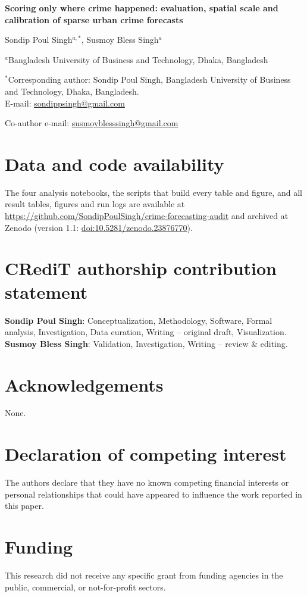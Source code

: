 \documentclass[11pt]{article}
\begin{document}
\begin{center}
{\Large\bfseries Scoring only where crime happened: evaluation, spatial scale and calibration of sparse urban crime forecasts\par}
\vspace{1.2em}
{\large Sondip Poul Singh$^{a,*}$, Susmoy Bless Singh$^{a}$\par}
\vspace{0.6em}
$^{a}$Bangladesh University of Business and Technology, Dhaka, Bangladesh\par
\end{center}

\vspace{1em}
\noindent $^{*}$Corresponding author: Sondip Poul Singh, Bangladesh University of Business and Technology, Dhaka, Bangladesh.\\
E-mail: \href{mailto:sondippsingh@gmail.com}{sondippsingh@gmail.com}

\noindent Co-author e-mail: \href{mailto:susmoyblesssingh@gmail.com}{susmoyblesssingh@gmail.com}

\section*{Data and code availability}
The four analysis notebooks, the scripts that build every table and figure, and all result tables, figures and run logs are available at \url{https://github.com/SondipPoulSingh/crime-forecasting-audit} and archived at Zenodo (version 1.1: \href{https://doi.org/10.5281/zenodo.23876770}{doi:10.5281/zenodo.23876770}).

\section*{CRediT authorship contribution statement}
\textbf{Sondip Poul Singh}: Conceptualization, Methodology, Software, Formal analysis, Investigation, Data curation, Writing -- original draft, Visualization. \textbf{Susmoy Bless Singh}: Validation, Investigation, Writing -- review \& editing.

\section*{Acknowledgements}
None.

\section*{Declaration of competing interest}
The authors declare that they have no known competing financial interests or personal relationships that could have appeared to influence the work reported in this paper.

\section*{Funding}
This research did not receive any specific grant from funding agencies in the public, commercial, or not-for-profit sectors.
\end{document}
